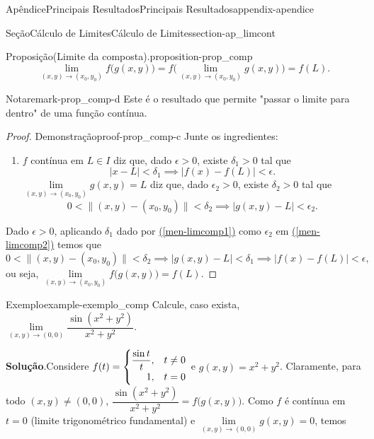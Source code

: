 \documentclass[oneside,10pt,]{book}
\newcommand{\blocktitlefont}{\relax}
\newcommand{\xreffont}{\relax}
\numberwithin{equation}{section}
\begin{document}
\begin{appendixptx}{Apêndice}{Principais Resultados}{}{Principais Resultados}{}{}{appendix-apendice}
\begin{sectionptx}{Seção}{Cálculo de Limites}{}{Cálculo de Limites}{}{}{section-ap_limcont}
\begin{proposition}{Proposição}{(Limite da composta).}{}{proposition-prop_comp}
\begin{equation*}
\lim\limits_{(x,y)\to(x_0,y_0)}f\big(g(x,y)\big)=f\Big(\lim\limits_{(x,y)\to(x_0,y_0)}g(x,y)\Big)=f(L)\text{.}
\end{equation*}
%
\begin{remark}{Nota}{}{remark-prop_comp-d}%
Este é o resultado que permite "passar o limite para dentro" de uma função contínua.\end{remark}
\end{proposition}
\begin{proof}{Demonstração}{}{proof-prop_comp-c}
Junte os ingredientes:%
\begin{enumerate}
\item{}\(f\) contínua em \(L\in I\) diz que, dado \(\epsilon>0\), existe \(\delta_1>0\) tal que%
\begin{equation}
|x-L|<\delta_1\implies
|f(x)-f(L)|<\epsilon.\label{men-limcomp1}
\end{equation}
\(\lim\limits_{(x,y)\to(x_0,y_0)} g(x,y)=L\) diz que, dado \(\epsilon_2>0\), existe \(\delta_2>0\) tal que%
\begin{equation}
0<\|(x,y)-(x_0,y_0)\|<\delta_2 \implies
|g(x,y)-L|<\epsilon_2.\label{men-limcomp2}
\end{equation}
%
\end{enumerate}
%
\par
Dado \(\epsilon>0\), aplicando \(\delta_1\) dado por \hyperref[men-limcomp1]{({\xreffont\ref{men-limcomp1}})} como \(\epsilon_2\) em \hyperref[men-limcomp2]{({\xreffont\ref{men-limcomp2}})} temos que%
\begin{equation*}
0<\|(x,y)-(x_0,y_0)\|<\delta_2 \implies
|g(x,y)-L|<\delta_1\implies |f(x)-f(L)|<\epsilon,
\end{equation*}
ou seja, \(\lim\limits_{(x,y)\to(x_0,y_0)}f\big(g(x,y)\big)=f(L)\).%
\end{proof}
\begin{example}{Exemplo}{}{example-exemplo_comp}%
Calcule, caso exista, \(\lim\limits_{(x,y)\to(0,0)}\dfrac{\sin(x^2+y^2)}{x^2+y^2}\).%
\par\smallskip%
\noindent\textbf{\blocktitlefont Solução}.\hypertarget{solution-exemplo_comp-b}{}\quad{}Considere \(f(t)=\begin{cases} \dfrac{\sin t}{t},& t\neq 0\\
\hfill 1,& t=0\end{cases}\) e \(g(x,y)=x^2+y^2\). Claramente, para todo \((x,y)\neq
(0,0)\), \(\dfrac{\sin(x^2+y^2)}{x^2+y^2}=f\big(g(x,y)\big)\). Como \(f\) é contínua em \(t=0\) (limite trigonométrico fundamental) e \(\lim\limits_{(x,y)\to(0,0)}g(x,y)=0\), temos%

\end{example}
\end{sectionptx}
\end{appendixptx}
\end{document}

